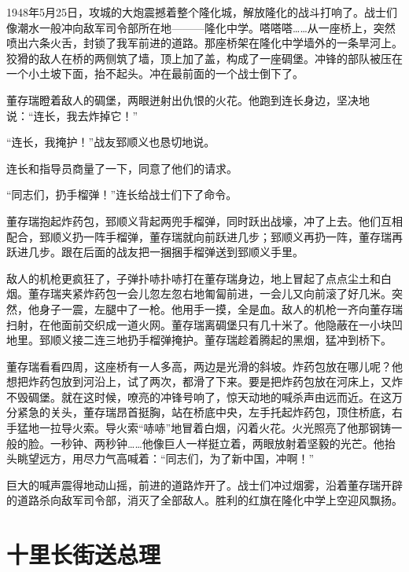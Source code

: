 \documentclass[12pt,UTF-8,openany]{ctexbook}
\begin{document}
\begin{Large}
    
    1948年5月25日，攻城的大炮震撼着整个隆化城，解放隆化的战斗打响了。战士们像潮水一般冲向敌军司令部所在地———隆化中学。嗒嗒嗒……从一座桥上，突然喷出六条火舌，封锁了我军前进的道路。那座桥架在隆化中学墙外的一条旱河上。狡猾的敌人在桥的两侧筑了墙，顶上加了盖，构成了一座碉堡。冲锋的部队被压在一个小土坡下面，抬不起头。冲在最前面的一个战士倒下了。
    
    董存瑞瞪着敌人的碉堡，两眼迸射出仇恨的火花。他跑到连长身边，坚决地说：“连长，我去炸掉它！”
    
    “连长，我掩护！”战友郅顺义也恳切地说。
    
    连长和指导员商量了一下，同意了他们的请求。
    
    “同志们，扔手榴弹！”连长给战士们下了命令。
    
    董存瑞抱起炸药包，郅顺义背起两兜手榴弹，同时跃出战壕，冲了上去。他们互相配合，郅顺义扔一阵手榴弹，董存瑞就向前跃进几步；郅顺义再扔一阵，董存瑞再跃进几步。跟在后面的战友把一捆捆手榴弹送到郅顺义手里。
    
    敌人的机枪更疯狂了，子弹扑哧扑哧打在董存瑞身边，地上冒起了点点尘土和白烟。董存瑞夹紧炸药包一会儿忽左忽右地匍匐前进，一会儿又向前滚了好几米。突然，他身子一震，左腿中了一枪。他用手一摸，全是血。敌人的机枪一齐向董存瑞扫射，在他面前交织成一道火网。董存瑞离碉堡只有几十米了。他隐蔽在一小块凹地里。郅顺义接二连三地扔手榴弹掩护。董存瑞趁着腾起的黑烟，猛冲到桥下。
    
    董存瑞看看四周，这座桥有一人多高，两边是光滑的斜坡。炸药包放在哪儿呢？他想把炸药包放到河沿上，试了两次，都滑了下来。要是把炸药包放在河床上，又炸不毁碉堡。就在这时候，嘹亮的冲锋号响了，惊天动地的喊杀声由远而近。在这万分紧急的关头，董存瑞昂首挺胸，站在桥底中央，左手托起炸药包，顶住桥底，右手猛地一拉导火索。导火索“哧哧”地冒着白烟，闪着火花。火光照亮了他那钢铸一般的脸。一秒钟、两秒钟……他像巨人一样挺立着，两眼放射着坚毅的光芒。他抬头眺望远方，用尽力气高喊着：“同志们，为了新中国，冲啊！”
    
    巨大的喊声震得地动山摇，前进的道路炸开了。战士们冲过烟雾，沿着董存瑞开辟的道路杀向敌军司令部，消灭了全部敌人。胜利的红旗在隆化中学上空迎风飘扬。
    
\end{Large}

\chapter{十里长街送总理}
\end{document}
